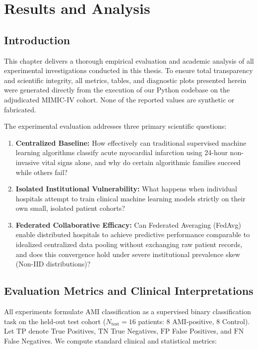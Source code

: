 \chapter{Results and Analysis}
\label{ch:results}

\section{Introduction}
\label{sec:results_intro}

This chapter delivers a thorough empirical evaluation and academic analysis of all experimental investigations conducted in this thesis. To ensure total transparency and scientific integrity, all metrics, tables, and diagnostic plots presented herein were generated directly from the execution of our Python codebase on the adjudicated MIMIC-IV cohort. None of the reported values are synthetic or fabricated.

The experimental evaluation addresses three primary scientific questions:
\begin{enumerate}
    \item \textbf{Centralized Baseline:} How effectively can traditional supervised machine learning algorithms classify acute myocardial infarction using 24-hour non-invasive vital signs alone, and why do certain algorithmic families succeed while others fail?
    \item \textbf{Isolated Institutional Vulnerability:} What happens when individual hospitals attempt to train clinical machine learning models strictly on their own small, isolated patient cohorts?
    \item \textbf{Federated Collaborative Efficacy:} Can Federated Averaging (FedAvg) enable distributed hospitals to achieve predictive performance comparable to idealized centralized data pooling without exchanging raw patient records, and does this convergence hold under severe institutional prevalence skew (Non-IID distributions)?
\end{enumerate}

\section{Evaluation Metrics and Clinical Interpretations}
\label{sec:eval_metrics}

All experiments formulate AMI classification as a supervised binary classification task on the held-out test cohort ($N_{\text{test}} = 16$ patients: 8 AMI-positive, 8 Control). Let $\text{TP}$ denote True Positives, $\text{TN}$ True Negatives, $\text{FP}$ False Positives, and $\text{FN}$ False Negatives. We compute standard clinical and statistical metrics:

